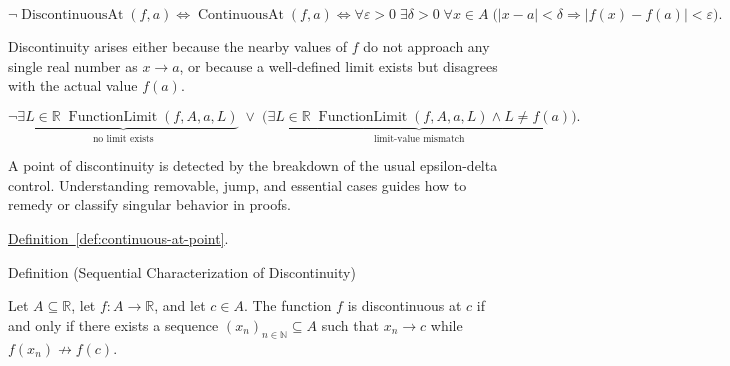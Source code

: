 \begin{remark*}
\[
\neg \operatorname{DiscontinuousAt}(f,a)
\Longleftrightarrow
\operatorname{ContinuousAt}(f,a)
\Longleftrightarrow
\forall \varepsilon > 0\; \exists \delta > 0\; \forall x \in A\;
\bigl(|x-a|<\delta \Rightarrow |f(x)-f(a)| < \varepsilon\bigr).
\]
\end{remark*}

\begin{remark*}
Discontinuity arises either because the nearby values of $f$ do not approach any single real number as $x \to a$, or because a well-defined limit exists but disagrees with the actual value $f(a)$.
\end{remark*}

\begin{remark*}
\[
\underbrace{\neg \exists L \in \mathbb{R}\; \operatorname{FunctionLimit}(f,A,a,L)}_{\text{no limit exists}}
\;\lor\;
\underbrace{\bigl(\exists L \in \mathbb{R}\; \operatorname{FunctionLimit}(f,A,a,L) \land L \ne f(a)\bigr)}_{\text{limit-value mismatch}}.
\]
\end{remark*}

\begin{remark*}[Interpretation]
A point of discontinuity is detected by the breakdown of the usual epsilon-delta control. Understanding removable, jump, and essential cases guides how to remedy or classify singular behavior in proofs.
\end{remark*}

\begin{dependencies}
\hyperref[def:continuous-at-point]{Definition~\ref*{def:continuous-at-point}}.
\end{dependencies}


\begin{definitionbox}{Definition (Sequential Characterization of Discontinuity)}
\begin{definition}
\label{def:sequential-discontinuity-at-a-point}
Let $A \subseteq \mathbb{R}$, let $f:A \to \mathbb{R}$, and let $c \in A$. The function $f$ is discontinuous at $c$ if and only if there exists a sequence $(x_n)_{n\in\mathbb{N}} \subseteq A$ such that $x_n \to c$ while $f(x_n) \not\to f(c)$.
\end{definition}
\end{definitionbox}

